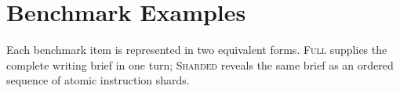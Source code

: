 \clearpage
\appendix
\section{Benchmark Examples}
\label{app:dataset_examples}

\noindent
Each benchmark item is represented in two equivalent forms. \textsc{Full} supplies
the complete writing brief in one turn; \textsc{Sharded} reveals the same brief as
an ordered sequence of atomic instruction shards.

\newcommand{\domainpill}[1]{%
  \tcbox[on line,colback=blue!9,colframe=blue!45!black,boxrule=.35pt,
  arc=1mm,boxsep=.65pt,left=1.4mm,right=1.4mm]{\scriptsize\textsc{#1}}%
}
\newcommand{\examplecard}[4]{%
  \begin{tcolorbox}[benchmarkcard,title={\strut\textbf{#2}\hfill\domainpill{#1}}]
  \small
  \textcolor{black!65}{\textsc{Full}}\quad #3

  \vspace{0.45em}
  \textcolor{black!65}{\textsc{Sharded shards}}\vspace{-0.2em}
  \begin{enumerate}[label=\textcolor{blue!65!black}{\textbf{\arabic*.}},
      leftmargin=1.65em,itemsep=.13em,topsep=.25em,parsep=0pt]
    #4
  \end{enumerate}
  \end{tcolorbox}%
}

